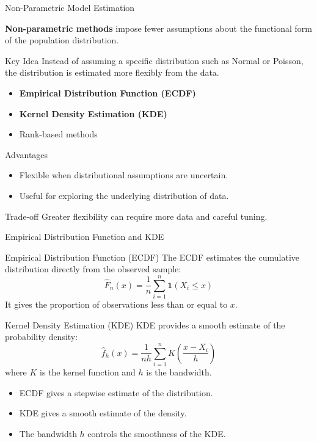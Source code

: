 \documentclass{beamer}
\begin{document}
\begin{frame}{Non-Parametric Model Estimation}

\textbf{Non-parametric methods} impose fewer assumptions about
the functional form of the population distribution.

\begin{block}{Key Idea}
Instead of assuming a specific distribution such as Normal or
Poisson, the distribution is estimated more flexibly from the data.
\end{block}

\begin{itemize}
    \item \textbf{Empirical Distribution Function (ECDF)}
    \item \textbf{Kernel Density Estimation (KDE)}
    \item Rank-based methods
\end{itemize}

\begin{block}{Advantages}
\begin{itemize}
    \item Flexible when distributional assumptions are uncertain.
    \item Useful for exploring the underlying distribution of data.
\end{itemize}
\end{block}

\begin{block}{Trade-off}
Greater flexibility can require more data and careful tuning.
\end{block}

\end{frame}


\begin{frame}{Empirical Distribution Function and KDE}

\begin{block}{Empirical Distribution Function (ECDF)}
The ECDF estimates the cumulative distribution directly from
the observed sample:
\[
\boxed{
\hat F_n(x)
=
\frac{1}{n}
\sum_{i=1}^{n}
\mathbf{1}(X_i\leq x)
}
\]
It gives the proportion of observations less than or equal to $x$.
\end{block}

\begin{block}{Kernel Density Estimation (KDE)}
KDE provides a smooth estimate of the probability density:
\[
\boxed{
\hat f_h(x)
=
\frac{1}{nh}
\sum_{i=1}^{n}
K\left(\frac{x-X_i}{h}\right)
}
\]
where $K$ is the kernel function and $h$ is the bandwidth.
\end{block}

\begin{itemize}
    \item ECDF gives a stepwise estimate of the distribution.
    \item KDE gives a smooth estimate of the density.
    \item The bandwidth $h$ controls the smoothness of the KDE.
\end{itemize}

\end{frame}
\end{document}
